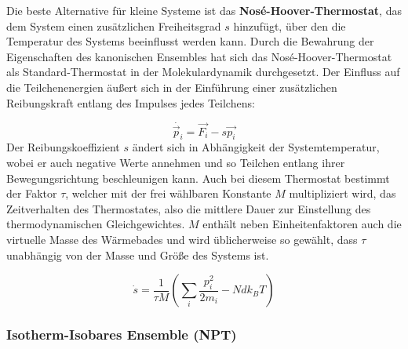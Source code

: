 
Die beste Alternative für kleine Systeme ist das \textbf{Nosé-Hoover-Thermostat}\cite{nose_unified_1984,hoover_canonical_1985}, das dem System einen zusätzlichen Freiheitsgrad $s$ hinzufügt, über den die Temperatur des Systems beeinflusst werden kann.
Durch die Bewahrung der Eigenschaften des kanonischen Ensembles hat sich das Nosé-Hoover-Thermostat als Standard-Thermostat in der Molekulardynamik durchgesetzt.
Der Einfluss auf die Teilchenenergien äußert sich in der Einführung einer zusätzlichen Reibungskraft entlang des Impulses jedes Teilchens:

\begin{equation}
  \dot{\vec p_i} = \vec{F_i} - s \vec{p_i}
\end{equation}
Der Reibungskoeffizient $s$ ändert sich in Abhängigkeit der Systemtemperatur, wobei er auch negative Werte annehmen und so Teilchen entlang ihrer Bewegungsrichtung beschleunigen kann.
Auch bei diesem Thermostat bestimmt der Faktor $\tau$, welcher mit der frei wählbaren Konstante $M$ multipliziert wird, das Zeitverhalten des Thermostates, also die mittlere Dauer zur Einstellung des thermodynamischen Gleichgewichtes.
$M$ enthält neben Einheitenfaktoren auch die virtuelle Masse des Wärmebades und wird üblicherweise so gewählt, dass $\tau$ unabhängig von der Masse und Größe des Systems ist.

\begin{equation}
  \dot s = \frac{1}{\tau M} \left(\sum_i{\frac{p_i^2}{2m_i}} - N d k_B T\right)
\end{equation}

\subsubsection{Isotherm-Isobares Ensemble (NPT)}

